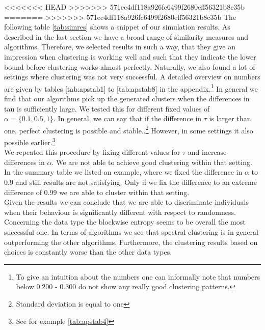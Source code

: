 \documentclass[12pt,a4paper,bibliography=totocnumbered,listof=totocnumbered]{scrartcl}
\begin{document}
<<<<<<< HEAD
>>>>>>> 571ec4df118a926fc6499f2680eff56321b8c35b
=======
>>>>>>> 571ec4df118a926fc6499f2680eff56321b8c35b
The following table \ref{tab:simres}  shows a snippet of our simulation results. As described in the last section we have a broad range of similarity measures and algorithms. Therefore, we selected results in such a way, that they give an impression when clustering is working well and such that they indicate the lower bound before clustering works almost perfectly. Naturally, we also found a lot of settings where clustering was not very successful. A detailed overview on numbers are given by tables \ref{tab:apstab1} to \ref{tab:apstab8} in the appendix.\footnote{To give an intuition about the numbers one can informally note that numbers below 0.200 - 0.300 do not show any really good clustering patterns.}
In general we find that our algorithms pick up the generated clusters when the differences in tau is sufficiently large. We tested this for different fixed values of $\alpha=\{0.1,0.5,1\}$. In general, we can say that if the difference in $\tau$ is larger than one, perfect clustering is possible and stable..\footnote{Standard deviation is equal to one} However, in some settings it also possible earlier.\footnote{See for example \ref{tab:apstab4} } \\
We repeated this procedure by fixing different values for $\tau$ and increase differences in $\alpha$. We are not able to achieve good clustering within that setting. In the summary table we listed an example, where we fixed the difference in $\alpha$ to 0.9 and still results are not satisfying. Only if we fix the difference to an extreme difference of 0.99 we are able to cluster within that setting.\\
Given the results we can conclude that we are able to discriminate individuals when their behaviour is significantly different with respect to randomness.\\
Concerning the data type the blockwise entropy seems to be overall the most successful one. In terms of algorithms we see that spectral clustering is in general outperforming the other algorithms. Furthermore, the clustering results based on choices is constantly worse than the other data types.

\pagebreak
\end{document}
